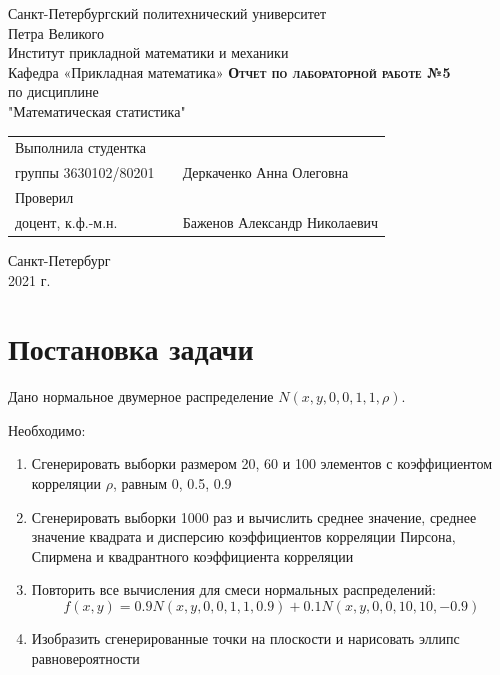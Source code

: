\documentclass[12pt,a4paper]{article}
\begin{document}
    \begin{titlepage}
        \begin{center}
            \large
            Санкт-Петербургский политехнический университет\\Петра Великого\\
            \vspace{0.5cm}
            Институт прикладной математики и механики\\
            \vspace{0.25cm}
            Кафедра «Прикладная математика»
            \vfill
            \textsc{\LARGE\textbf{Отчет по лабораторной работе №5}}\\[5mm]
            \Large
            по дисциплине\\"Математическая статистика"
        \end{center}
        \vfill
        \begin{tabular}{l p{} l}
            Выполнила студентка\\группы 3630102/80201 && Деркаченко Анна Олеговна
            \vspace{0.25cm}
            \\Проверил\\доцент, к.ф.-м.н. && Баженов Александр Николаевич
        \end{tabular}
        \vfill
        \begin{center}
            Санкт-Петербург\\2021 г.
        \end{center}
    \end{titlepage}

\newpage
\begin{center}
    \tableofcontents
    \setcounter{page}{2}
\end{center}
\newpage
\begin{center}
    \listoffigures
\end{center}

\newpage
\section{Постановка задачи}
Дано нормальное двумерное распределение $N(x,y,0,0,1,1,\rho)$.

Необходимо:
\begin{enumerate}
    \item Сгенерировать выборки размером 20, 60 и 100 элементов с коэффициентом корреляции $\rho$, равным 0, 0.5, 0.9
    \item Сгенерировать выборки 1000 раз и вычислить среднее значение, среднее значение квадрата и дисперсию коэффициентов корреляции Пирсона, Спирмена и квадрантного коэффициента корреляции
    \item Повторить все вычисления для смеси нормальных распределений:
        \begin{equation}
	        f(x,y)=0.9N(x,y,0,0,1,1,0.9)+0.1N(x,y,0,0,10,10,-0.9)
        \end{equation}
    \item Изобразить сгенерированные точки на плоскости и нарисовать эллипс равновероятности
\end{enumerate}
\end{document}
